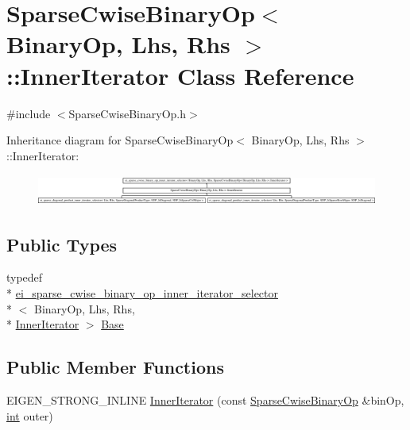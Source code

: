 \hypertarget{class_sparse_cwise_binary_op_1_1_inner_iterator}{\section{Sparse\-Cwise\-Binary\-Op$<$ Binary\-Op, Lhs, Rhs $>$\-:\-:Inner\-Iterator Class Reference}
\label{class_sparse_cwise_binary_op_1_1_inner_iterator}
}


{\ttfamily \#include $<$Sparse\-Cwise\-Binary\-Op.\-h$>$}

Inheritance diagram for Sparse\-Cwise\-Binary\-Op$<$ Binary\-Op, Lhs, Rhs $>$\-:\-:Inner\-Iterator\-:\begin{figure}[H]
\begin{center}
\leavevmode
\includegraphics[height=1.040892cm]{class_sparse_cwise_binary_op_1_1_inner_iterator}
\end{center}
\end{figure}
\subsection*{Public Types}
\begin{DoxyCompactItemize}
\item 
typedef \\*
\hyperlink{classei__sparse__cwise__binary__op__inner__iterator__selector}{ei\-\_\-sparse\-\_\-cwise\-\_\-binary\-\_\-op\-\_\-inner\-\_\-iterator\-\_\-selector}\\*
$<$ Binary\-Op, Lhs, Rhs, \\*
\hyperlink{class_sparse_cwise_binary_op_1_1_inner_iterator}{Inner\-Iterator} $>$ \hyperlink{class_sparse_cwise_binary_op_1_1_inner_iterator_a05056b207f79207adf21c4ec5bce8302}{Base}
\end{DoxyCompactItemize}
\subsection*{Public Member Functions}
\begin{DoxyCompactItemize}
\item 
E\-I\-G\-E\-N\-\_\-\-S\-T\-R\-O\-N\-G\-\_\-\-I\-N\-L\-I\-N\-E \hyperlink{class_sparse_cwise_binary_op_1_1_inner_iterator_a071dc52f769fcfbee1352ff946a3f438}{Inner\-Iterator} (const \hyperlink{class_sparse_cwise_binary_op}{Sparse\-Cwise\-Binary\-Op} \&bin\-Op, \hyperlink{ioapi_8h_a787fa3cf048117ba7123753c1e74fcd6}{int} outer)
\end{DoxyCompactItemize}


